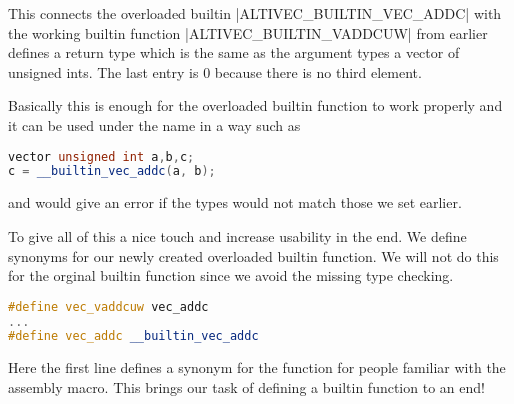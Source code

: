 This connects the overloaded builtin |ALTIVEC_BUILTIN_VEC_ADDC| with the working builtin function |ALTIVEC_BUILTIN_VADDCUW| from earlier defines a return type which is the same as the argument types a vector of unsigned ints. The last entry is 0 because there is no third element.

Basically this is enough for the overloaded builtin function to work properly and it can be used under the name in a way such as
\begin{lstlisting}[language=C++,basicstyle=\ttfamily\scriptsize,keywordstyle=\color{red}] 
vector unsigned int a,b,c;
c = __builtin_vec_addc(a, b);
\end{lstlisting}
and would give an error if the types would not match those we set earlier.

To give all of this a nice touch and increase usability in the end. We define synonyms for our newly created overloaded builtin function. We will not do this for the orginal builtin function since we avoid the missing type checking.
\begin{lstlisting}[language=C++,basicstyle=\ttfamily\scriptsize,keywordstyle=\color{red}] 
#define vec_vaddcuw vec_addc
...
#define vec_addc __builtin_vec_addc
\end{lstlisting}
Here the first line defines a synonym for the function for people familiar with the assembly macro.
This brings our task of defining a builtin function to an end!

